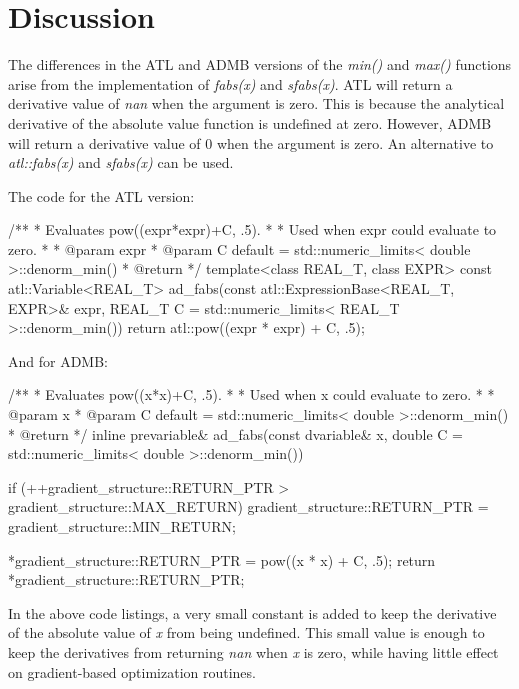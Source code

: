 \documentclass[oneside]{article}
\begin{document}
\section{Discussion}

The differences in the ATL and ADMB versions of the \textit{min()} and \textit{max()} functions arise from the implementation of \textit{fabs(x)} and \textit{sfabs(x)}.  ATL will return a derivative value of \textit{nan} when the argument is zero. This is because the analytical derivative of the absolute value function is undefined at zero. However, ADMB will return a derivative value of 0 when the argument is zero. An alternative to \textit{atl::fabs(x)} and \textit{sfabs(x)} can be used.

The code for the ATL version:


\begin{cppsource}
 /**
     * Evaluates pow((expr*expr)+C, .5).
     * 
     * Used when expr could evaluate to zero.
     * 
     * @param expr
     * @param C default = std::numeric_limits< double >::denorm_min()
     * @return 
     */
    template<class REAL_T, class EXPR>
    const atl::Variable<REAL_T> ad_fabs(const atl::ExpressionBase<REAL_T, EXPR>& expr,
     REAL_T C = std::numeric_limits< REAL_T >::denorm_min()) {
        return atl::pow((expr * expr) + C, .5);
    }

\end{cppsource}

And for ADMB:

\begin{cppsource}
/**
 * Evaluates pow((x*x)+C, .5).
 * 
 * Used when x could evaluate to zero.
 * 
 * @param x
 * @param C default = std::numeric_limits< double >::denorm_min()
 * @return 
 */
inline prevariable& ad_fabs(const dvariable& x, 
double C = std::numeric_limits< double >::denorm_min()) {
    if (++gradient_structure::RETURN_PTR > gradient_structure::MAX_RETURN)
        gradient_structure::RETURN_PTR = gradient_structure::MIN_RETURN;

    *gradient_structure::RETURN_PTR = pow((x * x) + C, .5);
    return *gradient_structure::RETURN_PTR;
}

\end{cppsource}

In the above code listings, a very small constant is added to keep the derivative of the absolute value of \textit{x} from being undefined. This small value is enough to keep the derivatives from returning \textit{nan} when \textit{x} is zero, while having little effect on gradient-based optimization routines.    
\end{document}
